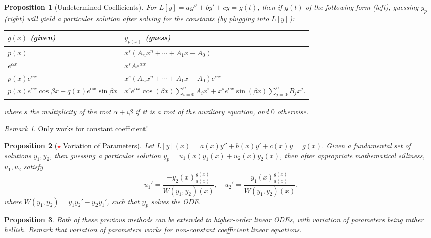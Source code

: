 \documentclass[12pt, oneside]{article}
\theoremstyle{definition}
\theoremstyle{plain}
\newtheorem{prop}{Proposition}
\theoremstyle{remark}
\newtheorem{remark}{Remark}
\begin{document}
\begin{prop}[Undetermined Coefficients]
  For $L[y] = ay''+by'+cy = g(t)$, then if $g(t)$ of the following form (left), guessing $y_p$ (right) will yield a particular solution after solving for the constants (by plugging into $L[y]$):
  \begin{table}[!ht]\centering
    \begin{tabularx}{\textwidth}{>{\centering\arraybackslash}X | >{\centering\arraybackslash}X }\centering
    
        $g(x)$ (given) & $y_{p(x)}$ (guess)\\
        \hline
        $p(x)$ &$x^s (A_n x^n + \cdots + A_1 x + A_0)$\\
        $e^{\alpha x} $&  $x^s Ae^{\alpha x}$\\
        $p(x)e^{\alpha x}$ & $x^s (A_n x^n + \cdots + A_1 x + A_0)e^{\alpha x}$\\
        $p(x)e^{\alpha x} \cos \beta x + q(x)e^{\alpha x} \sin \beta x$ &  $x^s e^{\alpha x} \cos (\beta x) \sum_{i=0}^n A_i x^i  + x^s e^{\alpha x} \sin (\beta x) \sum_{j=0}^n B_j x^j$.
    \end{tabularx}
    \end{table}
    where $s$ the multiplicity of the root $\alpha + i \beta$ if it is a root of the auxiliary equation, and $0$ otherwise.
\end{prop}

\begin{remark}
  Only works for constant coefficient!
\end{remark}

\begin{prop}[\textcolor{red}{$\star$} Variation of Parameters]
  Let $L[y](x) = a(x) y'' + b(x) y' + c(x) y = g(x)$. Given a fundamental set of solutions $y_1, y_2$, then guessing a particular solution $y_p = u_1(x)y_1(x) + u_2(x) y_2(x)$, then after appropriate mathematical silliness, $u_1, u_2$ satisfy \[
u_1' =   \frac{-y_2(x)\frac{g(x)}{a(x)}}{W(y_1, y_2)(x)}, \quad u_2' = \frac{y_1(x) \frac{g(x)}{a(x)}}{W(y_1, y_2)(x)},
  \]
  where $W(y_1, y_2) = y_1 y_2' - y_2 y_1'$, such that $y_p$ solves the ODE.
\end{prop}

\begin{prop}
  Both of these previous methods can be extended to higher-order linear ODEs, with variation of parameters being rather hellish. Remark that variation of parameters works for non-constant coefficient linear equations.  
\end{prop}
\end{document}
